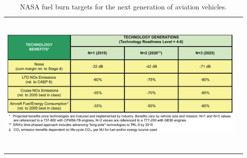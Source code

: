 \documentclass[12pt]{gatech-thesis}
\begin{document}
\begin{table}[ht]
\caption{NASA fuel burn targets for the next generation of aviation vehicles. \cite{Kestner2011}}
\centering
\begin{tabular}{cc}
\includegraphics[width=120mm, height = 70mm, trim=0mm 0mm 0mm 0mm, clip=true]{Fuel_Burn_Targets.png}
\end{tabular}
\label{Fuel_Burn_Targets}
\end{table}
\end{document}
